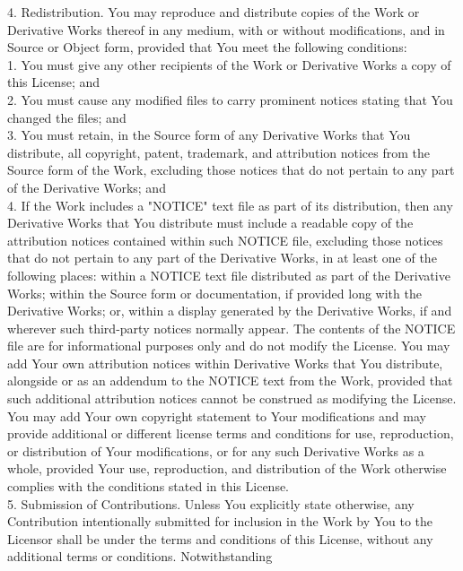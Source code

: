 {4. Redistribution. You may reproduce and distribute copies of the Work
or Derivative Works thereof in any medium, with or without
modifications, and in Source or Object form, provided that You meet
the following conditions:
\\[4pt]
   1. You must give any other recipients of the Work or Derivative
   Works a copy of this License; and
\\[4pt]
   2. You must cause any modified files to carry prominent notices
   stating that You changed the files; and
\\[4pt]
   3. You must retain, in the Source form of any Derivative Works that
   You distribute, all copyright, patent, trademark, and attribution
   notices from the Source form of the Work, excluding those notices
   that do not pertain to any part of the Derivative Works; and
\\[4pt]
   4. If the Work includes a "NOTICE" text file as part of its
   distribution, then any Derivative Works that You distribute must
   include a readable copy of the attribution notices contained within
   such NOTICE file, excluding those notices that do not pertain to
   any part of the Derivative Works, in at least one of the following
   places: within a NOTICE text file distributed as part of the
   Derivative Works; within the Source form or documentation, if
   provided long with the Derivative Works; or, within a display
   generated by the Derivative Works, if and wherever such third-party
   notices normally appear. The contents of the NOTICE file are for
   informational purposes only and do not modify the License. You may
   add Your own attribution notices within Derivative Works that You
   distribute, alongside or as an addendum to the NOTICE text from the
   Work, provided that such additional attribution notices cannot be
   construed as modifying the License.
\\[4pt]
You may add Your own copyright statement to Your modifications and may
provide additional or different license terms and conditions for use,
reproduction, or distribution of Your modifications, or for any such
Derivative Works as a whole, provided Your use, reproduction, and
distribution of the Work otherwise complies with the conditions stated
in this License.
\\[4pt]
5. Submission of Contributions. Unless You explicitly state otherwise,
any Contribution intentionally submitted for inclusion in the Work by
You to the Licensor shall be under the terms and conditions of this
License, without any additional terms or conditions. Notwithstanding
}
